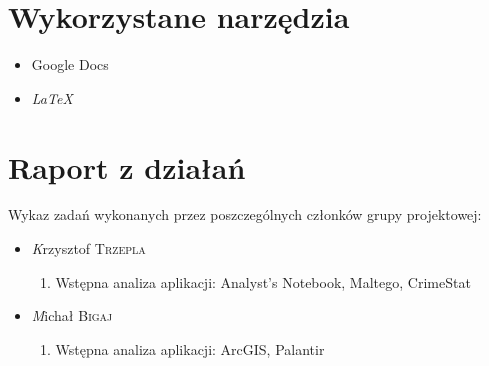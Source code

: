 \documentclass[11pt,a4paper]{article}
\begin{document}
\section{Wykorzystane narzędzia}

\begin{itemize}
	\item Google Docs
	\item \emph{LaTeX}
\end{itemize}

\newpage
\section{Raport z działań}

Wykaz zadań wykonanych przez poszczególnych członków grupy projektowej:
\begin{itemize}
	\item \emph Krzysztof \textsc{Trzepla} 
		\begin{enumerate}
			\item Wstępna analiza aplikacji: Analyst's Notebook, Maltego, CrimeStat
		\end{enumerate}
	\item \emph Michał \textsc{Bigaj} 
		\begin{enumerate}
			\item Wstępna analiza aplikacji: ArcGIS, Palantir
		\end{enumerate}
\end{itemize}
\end{document}
